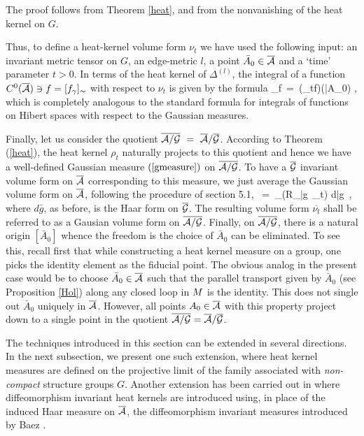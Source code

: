 The proof follows from Theorem \ref{heat}, and from the nonvanishing
of the heat kernel on $G$.
\medskip

Thus, to define a heat-kernel volume form $\nu_t$ we have used the
following input: an invariant metric tensor on $G$, an edge-metric $l$,
a point $\bar{A}_0\in\Ab$ and a `time' parameter $t>0$. In terms of
the heat kernel of $\Delta^{(l)}$, the integral of a function
$C^0(\Ab)\ni f=[f_\g]_\sim$ with respect to $\nu_t$
is given by the formula
\be \label{gmeasure}
\int_{\Ab}f\ =\ (\rho_{t}\star f)(\bar{A}_0) ,
\ee
which is completely analogous to the standard formula for integrals
of functions on Hibert spaces with respect to the Gaussian measures.

Finally, let us consider the quotient $\agb\ =\ \Ab/\Gb $.  According
to Theorem (\ref{heat}), the heat kernel $\rho_t$ naturally projects
to this quotient and hence we have a well-defined Gaussian measure
$(\ref{gmeasure})$ on $\agb$. To have a $\Gb$ invariant volume form on
$\Ab$ corresponding to this measure, we just average the Gaussian
volume form on $\Ab$, following the procedure of section 5.1,
\be
{}\ =\ \int_\Gb (R_{\bar g\star}\ \nu_t) d{\bar g}\ ,
\ee
where $d\bar{g}$, as before, is the Haar form on $\Gb$.  The resulting
volume form $\overline {\nu_t}$ shall be referred to as a Gausian
volume form on $\agb$. Finally, on $\agb$, there is a natural origin
$[\bar{A}_0]$ whence the freedom is the choice of $\bar{A}_0$ can be
eliminated.  To see this, recall first that while constructing a heat
kernel measure on a group, one picks the identity element as the
fiducial point.  The obvious analog in the present case would be to
choose $\bar{A}_0\in\Ab$ such that the parallel transport given by
$\bar{A}_0$ (see Proposition \ref{Hol}) along any closed loop in $\S$
is the identity. This does not single out $\bar{A}_0$ uniquely in
$\Ab$. However, all points $A_0\in \Ab$ with this property project
down to a single point in the quotient $\agb=\Ab/\Gb$.

\bigskip

The techniques introduced in this section can be extended in several
directions. In the next subsection, we present one such extension,
where heat kernel measures are defined on the projective limit of the
family associated with {\it non-compact} structure groups $G$.
Another extension has been carried out in \cite{ALMMT3} where
diffeomorphism invariant heat kernels are introduced using, in place
of the induced Haar measure on $\Ab$, the diffeomorphism invariant
measures introduced by Baez \cite{B1,B2}.
 
